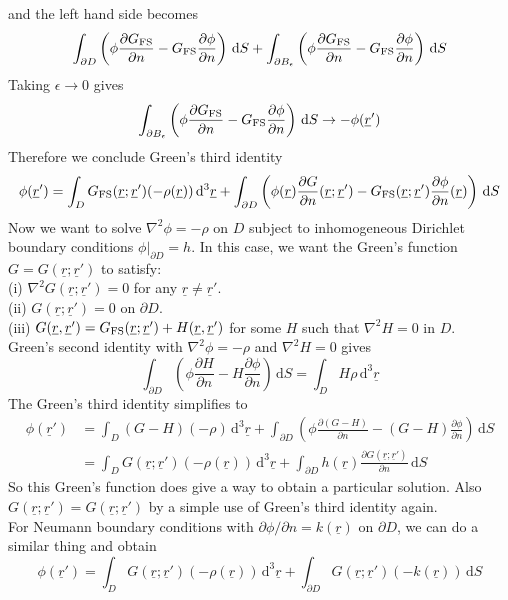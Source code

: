 and the left hand side becomes
$$\int_{\partial D}\left( \phi\frac{\partial G_{\rm FS}}{\partial n}-G_{\rm FS}\frac{\partial\phi}{\partial n} \right)\,\mathrm dS+\int_{\partial B_\epsilon}\left( \phi\frac{\partial G_{\rm FS}}{\partial n}-G_{\rm FS}\frac{\partial\phi}{\partial n} \right)\,\mathrm dS$$
Taking $\epsilon\to 0$ gives
$$\int_{\partial B_\epsilon}\left( \phi\frac{\partial G_{\rm FS}}{\partial n}-G_{\rm FS}\frac{\partial\phi}{\partial n} \right)\,\mathrm dS\to-\phi(\underline{r}')$$
Therefore we conclude Green's third identity
$$\phi(\underline{r}')=\int_DG_{\rm FS}(\underline{r};\underline{r}')(-\rho(\underline{r}))\,\mathrm d^3\underline{r}+\int_{\partial D}\left( \phi(\underline{r})\frac{\partial G}{\partial n}(\underline{r};\underline{r}')-G_{\rm FS}(\underline{r};\underline{r}')\frac{\partial\phi}{\partial n}(\underline{r}) \right)\,\mathrm dS$$
Now we want to solve $\nabla^2\phi=-\rho$ on $D$ subject to inhomogeneous Dirichlet boundary conditions $\phi|_{\partial D}=h$.
In this case, we want the Green's function $G=G(\underline{r};\underline{r}')$ to satisfy:\\
(i) $\nabla^2G(\underline{r};\underline{r}')=0$ for any $\underline{r}\neq\underline{r}'$.\\
(ii) $G(\underline{r};\underline{r}')=0$ on $\partial D$.\\
(iii) $G(\underline{r},\underline{r}')=G_{\rm FS}(\underline{r};\underline{r}')+H(\underline{r},\underline{r}')$ for some $H$ such that $\nabla^2H=0$ in $D$.\\
Green's second identity with $\nabla^2\phi=-\rho$ and $\nabla^2H=0$ gives
$$\int_{\partial D}\left( \phi\frac{\partial H}{\partial n}-H\frac{\partial\phi}{\partial n} \right)\,\mathrm dS=\int_DH\rho\,\mathrm d^3\underline{r}$$
The Green's third identity simplifies to
\begin{align*}
    \phi(\underline{r}')&=\int_D(G-H)(-\rho)\,\mathrm d^3\underline{r}+\int_{\partial D}\left( \phi\frac{\partial (G-H)}{\partial n}-(G-H)\frac{\partial\phi}{\partial n} \right)\,\mathrm dS\\
    &=\int_DG(\underline{r};\underline{r}')(-\rho(\underline{r}))\,\mathrm d^3\underline{r}+\int_{\partial D}h(\underline{r})\frac{\partial G(\underline{r};\underline{r}')}{\partial n}\,\mathrm dS
\end{align*}
So this Green's function does give a way to obtain a particular solution.
Also $G(\underline{r};\underline{r}')=G(\underline{r};\underline{r}')$ by a simple use of Green's third identity again.\\
For Neumann boundary conditions with $\partial\phi/\partial n=k(\underline{r})$ on $\partial D$, we can do a similar thing and obtain
$$\phi(\underline{r}')=\int_DG(\underline{r};\underline{r}')(-\rho(\underline{r}))\,\mathrm d^3\underline{r}+\int_{\partial D}G(\underline{r};\underline{r}')(-k(\underline{r}))\,\mathrm dS$$
